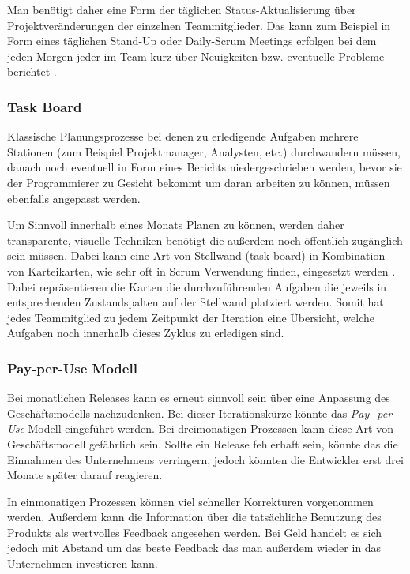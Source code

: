 Man benötigt daher eine Form der täglichen Status-Aktualisierung über
Projektveränderungen der einzelnen Teammitglieder. Das kann zum Beispiel in Form
eines täglichen Stand-Up oder Daily-Scrum Meetings erfolgen bei dem jeden
Morgen jeder im Team kurz über Neuigkeiten bzw. eventuelle Probleme berichtet
\cite{dpunktscrum2008}.

\subsubsection{Task Board}
\label{minisec:task}
Klassische Planungsprozesse bei denen zu erledigende Aufgaben mehrere
Stationen (zum Beispiel Projektmanager, Analysten, etc.) durchwandern müssen, danach
noch eventuell in Form eines Berichts niedergeschrieben werden, bevor sie der
Programmierer zu Gesicht bekommt um daran arbeiten zu können, müssen ebenfalls
angepasst werden.

Um Sinnvoll innerhalb eines Monats Planen zu können, werden daher
transparente, visuelle Techniken benötigt die außerdem noch öffentlich
zugänglich sein müssen. Dabei kann eine Art von Stellwand (task board) in
Kombination von Karteikarten, wie sehr oft in Scrum Verwendung finden,
eingesetzt werden \cite{dpunktscrum2008}. Dabei repräsentieren die Karten die durchzuführenden
Aufgaben die jeweils in entsprechenden Zustandspalten auf der Stellwand
platziert werden. Somit hat jedes Teammitglied zu jedem Zeitpunkt der
Iteration eine Übersicht, welche Aufgaben noch innerhalb dieses Zyklus zu
erledigen sind.

\subsubsection{Pay-per-Use Modell}
\label{minisec:pay-per-use-modell}

Bei monatlichen Releases kann es erneut sinnvoll sein über eine Anpassung des
Geschäftsmodells nachzudenken.  Bei dieser Iterationskürze könnte das \emph{Pay-
per-Use}-Modell eingeführt werden. Bei dreimonatigen Prozessen kann diese Art
von Geschäftsmodell gefährlich sein. Sollte ein Release fehlerhaft sein,
könnte das die Einnahmen des Unternehmens verringern, jedoch könnten die
Entwickler erst drei Monate später darauf reagieren.

In einmonatigen Prozessen können viel schneller Korrekturen vorgenommen
werden. Außerdem kann die Information über die tatsächliche Benutzung des
Produkts als wertvolles Feedback angesehen werden. Bei Geld handelt es sich
jedoch mit Abstand um das beste Feedback das man außerdem wieder in das
Unternehmen investieren kann.

